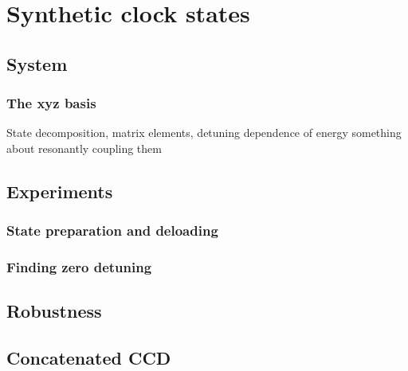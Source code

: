 
\renewcommand{\thechapter}{6}

\chapter{Synthetic clock states}

\section{System}
\subsection{The xyz basis}
State decomposition, matrix elements, detuning dependence of energy something about resonantly coupling them

\section{Experiments}
\subsection{State preparation and deloading}
\subsection{Finding zero detuning}


\section{Robustness}

\section{Concatenated CCD}




